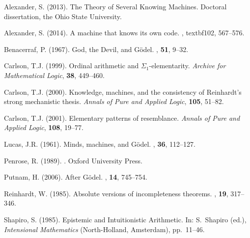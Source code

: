 \documentclass[reqno]{article}
\theoremstyle{definition}
\begin{document}
\begin{thebibliography}{99}

Alexander, S. (2013).
The Theory of Several Knowing Machines.  Doctoral dissertation, the Ohio State University.

Alexander, S. (2014).
\newblock A machine that knows its own code.
, textbf{102}, 567--576.

Benacerraf, P. (1967).
\newblock God, the Devil, and G\"{o}del.
, \textbf{51}, 9--32.

Carlson, T.J. (1999).  Ordinal arithmetic and $\Sigma_1$-elementarity.
\emph{Archive for Mathematical Logic}, \textbf{38}, 449--460.

Carlson, T.J. (2000). Knowledge, machines, and the consistency of Reinhardt's strong mechanistic thesis.
\hspace{-2pt}\emph{Annals of Pure and Applied Logic}, \textbf{105}, 51--82.

Carlson, T.J. (2001).  Elementary patterns of resemblance.
\emph{Annals of Pure and Applied Logic}, \textbf{108}, 19--77.

Lucas, J.R. (1961).
\newblock Minds, machines, and G\"{o}del.
, \textbf{36}, 112--127.

Penrose, R. (1989).
. Oxford University Press.

Putnam, H. (2006).
\newblock After G\"{o}del.
, \textbf{14}, 745--754.

Reinhardt, W. (1985).
\newblock Absolute versions of incompleteness theorems.
, \textbf{19}, 317--346.

%
%

Shapiro, S. (1985).  Epistemic and Intuitionistic Arithmetic.  In: S.~Shapiro (ed.), \emph{Intensional Mathematics} (North-Holland, Amsterdam),
pp.~11--46.

\end{thebibliography}
\end{document}
